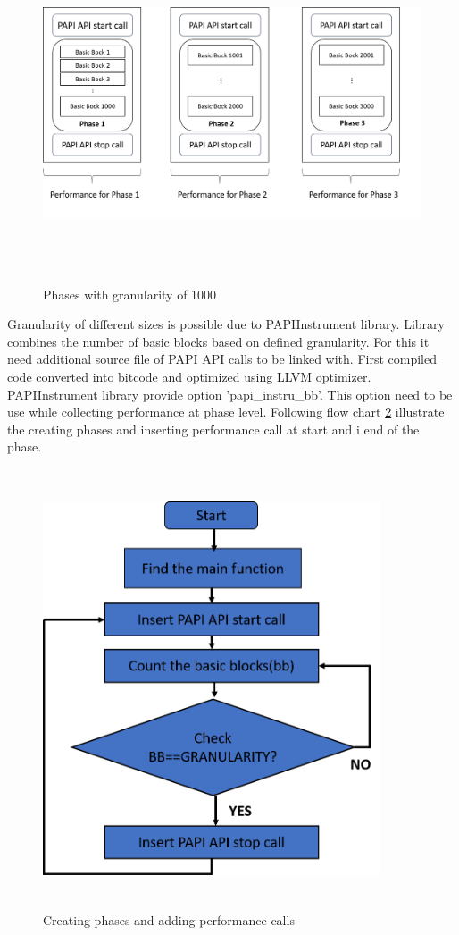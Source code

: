 \begin{figure}[h!]
\includegraphics[width=13cm, height=10cm]{./images/phase}
\centering
\caption{Phases with granularity of 1000}
\label{fig:phase}
\end{figure}

\par Granularity of different sizes is possible due to PAPIInstrument library. Library combines the number of basic blocks based on defined granularity. For this it need additional source file of PAPI API calls to be linked with. First compiled code converted into bitcode and optimized using LLVM optimizer. PAPIInstrument library provide option 'papi\_instru\_bb'. This option need to be use while collecting performance at phase level. Following flow chart \ref{fig:flow} illustrate the creating phases and inserting performance call at start and i end of the phase. 

\begin{figure}[h!]
\includegraphics[width=10cm, height=13cm]{./images/flow}
\centering
\caption{Creating phases and adding performance calls}
\label{fig:flow}
\end{figure}

